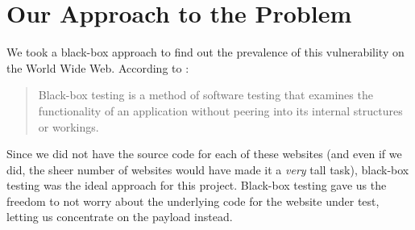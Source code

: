 \section[Approach]{Our Approach to the Problem}

We took a black-box approach to find out the prevalence of this vulnerability on the World Wide Web. According to \cite{wiki:Black-box_testing}:
\begin{quote}
	{Black-box testing is a method of software testing that examines the functionality of an application without peering into its internal structures or workings.}
\end{quote} 

Since we did not have the source code for each of these websites (and even if we did, the sheer number of websites would have made it a \emph{very} tall task), black-box testing was the ideal approach for this project.
Black-box testing gave us the freedom to not worry about the underlying code for the website under test, letting us concentrate on the payload instead.